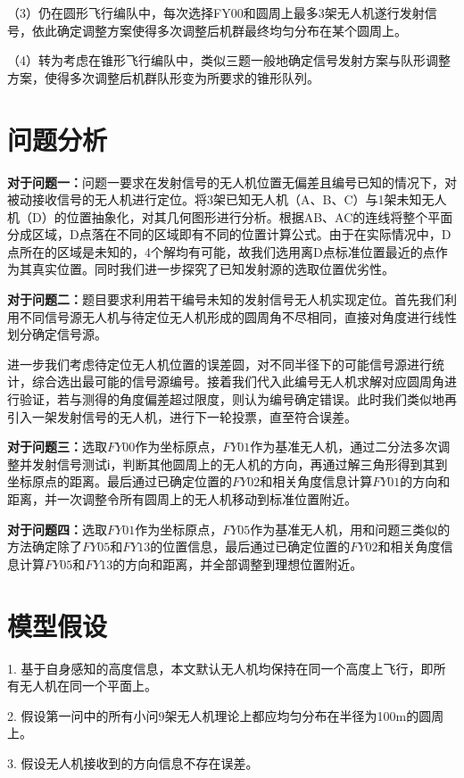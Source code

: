 \documentclass{ctexart}
\begin{document}
（3）仍在圆形飞行编队中，每次选择FY00和圆周上最多3架无人机遂行发射信号，依此确定调整方案使得多次调整后机群最终均匀分布在某个圆周上。

（4）转为考虑在锥形飞行编队中，类似三题一般地确定信号发射方案与队形调整方案，使得多次调整后机群队形变为所要求的锥形队列。

\section{问题分析}
\textbf{对于问题一：}问题一要求在发射信号的无人机位置无偏差且编号已知的情况下，对被动接收信号的无人机进行定位。将3架已知无人机（A、B、C）与1架未知无人机（D）的位置抽象化，对其几何图形进行分析。根据AB、AC的连线将整个平面分成区域，D点落在不同的区域即有不同的位置计算公式。由于在实际情况中，D点所在的区域是未知的，4个解均有可能，故我们选用离D点标准位置最近的点作为其真实位置。同时我们进一步探究了已知发射源的选取位置优劣性。

\textbf{对于问题二：}题目要求利用若干编号未知的发射信号无人机实现定位。首先我们利用不同信号源无人机与待定位无人机形成的圆周角不尽相同，直接对角度进行线性划分确定信号源。

进一步我们考虑待定位无人机位置的误差圆，对不同半径下的可能信号源进行统计，综合选出最可能的信号源编号。接着我们代入此编号无人机求解对应圆周角进行验证，若与测得的角度偏差超过限度，则认为编号确定错误。此时我们类似地再引入一架发射信号的无人机，进行下一轮投票，直至符合误差。

\textbf{对于问题三：}选取$FY00$作为坐标原点，$FY01$作为基准无人机，通过二分法多次调整并发射信号测试ℹ，判断其他圆周上的无人机的方向，再通过解三角形得到其到坐标原点的距离。最后通过已确定位置的$FY02$和相关角度信息计算$FY01$的方向和距离，并一次调整令所有圆周上的无人机移动到标准位置附近。
    
\textbf{对于问题四：}选取$FY01$作为坐标原点，$FY05$作为基准无人机，用和问题三类似的方法确定除了$FY05$和$FY13$的位置信息，最后通过已确定位置的$FY02$和相关角度信息计算$FY05$和$FY13$的方向和距离，并全部调整到理想位置附近。


\section{模型假设}
1. \quad 基于自身感知的高度信息，本文默认无人机均保持在同一个高度上飞行，即所有无人机在同一个平面上。

2. \quad 假设第一问中的所有小问9架无人机理论上都应均匀分布在半径为100m的圆周上。

3. \quad 假设无人机接收到的方向信息不存在误差。
\end{document}
